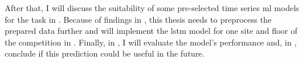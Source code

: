 After that, I will discuss the suitability of some pre-selected time series \ac{ml} models for the task in . 
Because of findings in , this thesis needs to preprocess the prepared data further and will implement the \ac{lstm} model for one site and floor of the competition in .
Finally, in , I will evaluate the model's performance and, in , conclude if this prediction could be useful in the future.
